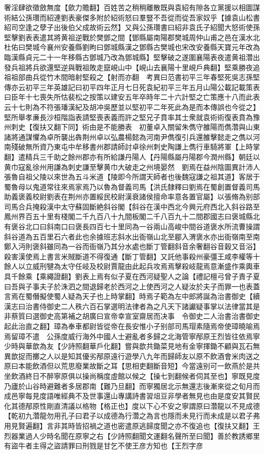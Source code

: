 奢淫肆欲徵斂無度【歛力贍翻】百姓苦之稍稍離散既與袁紹有隙各立黨援以相圖謀術結公孫瓚而紹連劉表豪傑多附於紹術怒曰羣豎不吾從而從吾家奴乎【據袁山松書紹司空逢之孽子出後伯父成故術云然】又與公孫瓚書曰紹非袁氏子紹聞大怒術使孫堅擊劉表表遣其將黄祖逆戰於樊鄧之間【鄧縣屬南陽郡樊城周仲山甫之邑在漢水北杜佑曰樊城今襄州安養縣劉昫曰鄧城縣漢之鄧縣古樊城也宋改安養縣天寶元年改為臨漢縣貞元二十一年移縣古鄧城乃改為鄧城縣】堅擊破之遂圍襄陽表夜遣黄祖濳出發兵祖將兵欲還堅逆與戰祖敗走竄峴山中【峴山去襄陽十里峴戶典翻】堅乘勝夜追祖祖部曲兵從竹木間暗射堅殺之【射而亦翻　考異曰范書初平三年春堅死吳志孫堅傳亦云初平三年英雄記曰初平四年正月七日死袁紀初平三年五月山陽公載記載策表曰臣年十七喪失所怙裴松之按策以建安五年卒時年二十六計堅之亡策應十八而此表云十七則為不符張璠漢紀及胡冲吳歷並以堅初平二年死此為是而本傳誤也今從之】堅所舉孝亷長沙桓階詣表請堅喪表義而許之堅兄子賁率其士衆就袁術術復表賁為豫州刺史【復扶又翻下同】術由是不能勝表　初董卓入關留朱儁守雒陽而儁濳與山東諸將通謀懼為卓所襲出犇荆州卓以弘農楊懿為河南尹儁復引兵還雒擊懿走之儁以河南殘破無所資乃東屯中牟移書州郡請師討卓徐州刺史陶謙上儁行車騎將軍【上時掌翻】遣精兵三千助之餘州郡亦有所給謙丹陽人【丹陽縣屬丹陽郡今潤州縣】朝廷以黄巾寇亂徐州用謙為刺史謙至擊黄巾大破走之州境晏然　劉焉在益州陰圖異計沛人張魯自祖父陵以來世為五斗米道【陵即今所謂天師者也後魏寇謙之祖其道】客居于蜀魯母以鬼道常往來焉家焉乃以魯為督義司馬【洪氏隸釋曰劉焉在蜀創置督義司馬助義褒義校尉劉表在荆州亦置綏民校尉漢衰諸侯擅命率意各置官屬】以張脩為别部司馬合兵掩殺漢中太守蘇固斷絶斜谷閣【斜谷在漢中西北今興元府西北入斜谷路至鳳州界百五十里有棧閣二千九百八十九間板閣二千八百九十二間郡國志曰褒城縣北有褒谷北口曰斜南口曰褒長四百七十里同為一谷兩山高峻中間谷道褒水所流曹操謂斜谷道為五百里石六者此也余據班志斜水出衙嶺山北至郿入渭褒水亦出衙嶺南至南鄭入沔則褒斜雖同為一谷而衙嶺乃其分水處也斷丁管翻斜音余奢翻谷音穀又音浴】殺害漢使焉上書言米賊斷道不得復通【斷丁管翻】又託他事殺州豪彊王咸李權等十餘人以立威刑犍為太守任岐及校尉賈龍由此起兵攻焉焉擊殺岐龍焉意漸盛作乘輿車具千餘乘【乘繩證翻】劉表上焉有似子夏在西河疑聖人之論【禮記檀弓曾子責子夏曰吾與子事夫子於洙泗之間退歸老於西河之上使西河之人疑汝於夫子而罪一也表蓋言焉在蜀僭擬使蜀人疑為天子也上時掌翻】時焉子範為左中郎將誕為治書御史【續漢志曰治書侍御史二人秩六百石掌選明法律者為之凡天下諸讞疑事掌以法律當其是非蔡質曰選御史高第補之胡廣曰宣帝幸宣室齋居而决事　令御史二人治書治書御史起此治直之翻】璋為奉車都尉皆從帝在長安惟小子别部司馬瑁素隨焉帝使璋曉喻焉焉留璋不遣　公孫度威行海外中國人士避亂者多歸之北海管寧邴原王烈皆往依焉寧少時與華歆為友【少詩照翻華戶化翻】嘗與歆共鋤菜見地有金寧揮鋤不顧與瓦石無異歆捉而擲之人以是知其優劣邴原遠行遊學八九年而歸師友以原不飲酒會米肉送之原曰本能飲酒但以荒思廢業故斷之耳【思相吏翻斷音短】今當遠别可一飲燕於是共坐飲酒終日不醉寧原俱以操尚稱度虛館以候之【操七到翻候者伺其至也】寧既見度乃廬於山谷時避難者多居郡南【難乃旦翻】而寧獨居北示無還志後漸來從之旬月而成邑寧每見度語唯經典不及世事還山專講詩書習俎豆非學者無見也由是度安其賢民化其德邴原性剛直清議以格物【格正也】度以下心不安之寧謂原曰濳龍以不見成德【乾初九濳龍勿用孔子曰君子以成德為行濳之為言也隱而未見行而未成是以君子弗用見賢遍翻】言非其時皆招禍之道也密遣原逃歸度聞之亦不復追也【復扶又翻】王烈器業過人少時名聞在原寧之右【少詩照翻聞文運翻名聲所至曰聞】善於教誘鄉里有盜牛者主得之盜請罪曰刑戮是甘乞不使王彦方知也【王烈字彦